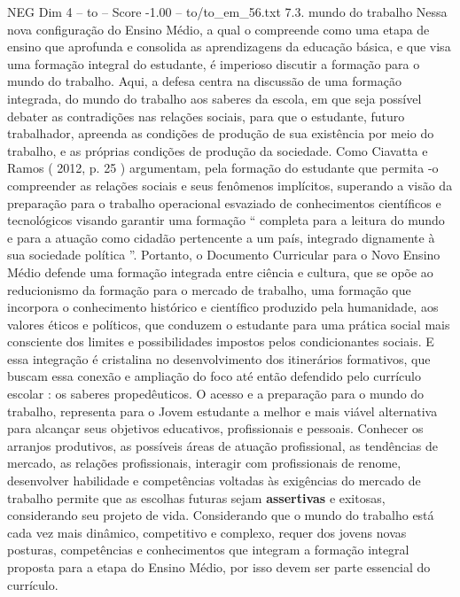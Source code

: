 \begin{textsample}{NEG Dim 4 – to – Score -1.00 – to/to\_em\_56.txt}  \label{ex:f4_neg_086}
7.3. mundo do trabalho Nessa nova configuração do Ensino Médio, a qual o compreende como uma etapa de ensino que aprofunda e consolida as aprendizagens da educação básica, e que visa uma formação integral do estudante, é imperioso discutir a formação para o mundo do trabalho.
Aqui, a defesa centra na discussão de uma formação integrada, do mundo do trabalho aos saberes da escola, em que seja possível debater as contradições nas relações sociais, para que o estudante, futuro trabalhador, apreenda as condições de produção de sua existência por meio do trabalho, e as próprias condições de produção da sociedade.
Como Ciavatta e Ramos ( 2012, p. 25 ) argumentam, pela formação do estudante que permita -o compreender as relações sociais e seus fenômenos implícitos, superando a visão da preparação para o trabalho operacional esvaziado de conhecimentos científicos e tecnológicos visando garantir uma formação “ completa para a leitura do mundo e para a atuação como cidadão pertencente a um país, integrado dignamente à sua sociedade política ”.
Portanto, o Documento Curricular para o Novo Ensino Médio defende uma formação integrada entre ciência e cultura, que se opõe ao reducionismo da formação para o mercado de trabalho, uma formação que incorpora o conhecimento histórico e científico produzido pela humanidade, aos valores éticos e políticos, que conduzem o estudante para uma prática social mais consciente dos limites e possibilidades impostos pelos condicionantes sociais.
E essa integração é cristalina no desenvolvimento dos itinerários formativos, que buscam essa conexão e ampliação do foco até então defendido pelo currículo escolar : os saberes propedêuticos.
O acesso e a preparação para o mundo do trabalho, representa para o Jovem estudante a melhor e mais viável alternativa para alcançar seus objetivos educativos, profissionais e pessoais.
Conhecer os arranjos produtivos, as possíveis áreas de atuação profissional, as tendências de mercado, as relações profissionais, interagir com profissionais de renome, desenvolver habilidade e competências voltadas às exigências do mercado de trabalho permite que as escolhas futuras sejam \textbf{assertivas} e exitosas, considerando seu projeto de vida.
Considerando que o mundo do trabalho está cada vez mais dinâmico, competitivo e complexo, requer dos jovens novas posturas, competências e conhecimentos que integram a formação integral proposta para a etapa do Ensino Médio, por isso devem ser parte essencial do currículo.

\end{textsample}
